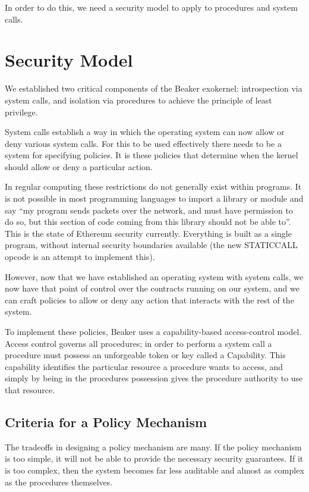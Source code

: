 \documentclass[english,a4paper]{article}
\begin{document}
In order to do this, we need a security model to apply to procedures and
system calls.

\section{Security Model}\label{security-model}
We established two critical components of the Beaker exokernel:
introspection via system calls, and isolation via procedures to achieve
the principle of least privilege.

System calls establish a way in which the operating system can now allow
or deny various system calls. For this to be used effectively there
needs to be a system for specifying policies. It is these policies that
determine when the kernel should allow or deny a particular action.

In regular computing these restrictions do not generally exist within
programs. It is not possible in most programming languages to import a
library or module and say ``my program sends packets over the network,
and must have permission to do so, but this section of code coming from
this library should not be able to''. This is the state of Ethereum
security currently. Everything is built as a single program, without
internal security boundaries available (the new STATICCALL opcode is an
attempt to implement this).

However, now that we have established an operating system with system
calls, we now have that point of control over the contracts running on
our system, and we can craft policies to allow or deny any action that
interacts with the rest of the system.

To implement these policies, Beaker uses a capability-based
access-control model. Access control governs all procedures; in order to
perform a system call a procedure must possess an unforgeable token or
key called a Capability. This capability identifies the particular
resource a procedure wants to access, and simply by being in the
procedures possession gives the procedure authority to use that
resource.

\subsection{Criteria for a Policy
Mechanism}\label{criteria-for-a-policy-mechanism}
The tradeoffs in designing a policy mechanism are many. If the policy
mechanism is too simple, it will not be able to provide the necessary
security guarantees. If it is too complex, then the system becomes far
less auditable and almost as complex as the procedures themselves.
\end{document}
